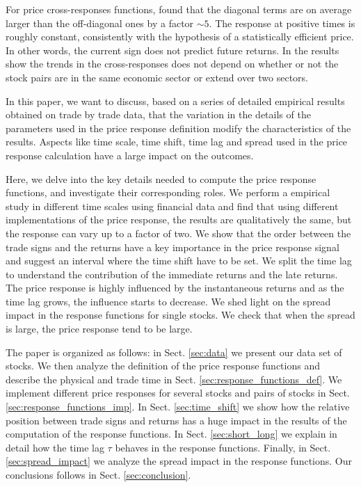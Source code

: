 For price cross-responses functions, \cite{dissecting_cross} found that the
diagonal terms are on average larger than the off-diagonal ones by a factor
$\sim 5$. The response at positive times is roughly constant, consistently with
the hypothesis of a statistically efficient price. In other words, the current
sign does not predict future returns. In \cite{Wang_2016_cross} the results
show the trends in the cross-responses does not depend on whether or not the
stock pairs are in the same economic sector or extend over two sectors.

In this paper, we want to discuss, based on a series of detailed empirical
results obtained on trade by trade data, that the variation in the details of
the parameters used in the price response definition modify the characteristics
of the results. Aspects like time scale, time shift, time lag and spread used
in the price response calculation have a large impact on the outcomes.

Here, we delve into the key details needed to compute the price response
functions, and investigate their corresponding roles. We perform a empirical
study in different time scales using financial data and find that using
different implementations of the price response, the results are qualitatively
the same, but the response can vary up to a factor of two. We show that the
order between the trade signs and the returns have a key importance in the
price response signal and suggest an interval where the time shift have to be
set. We split the time lag to understand the contribution of the immediate
returns and the late returns. The price response is highly influenced by the
instantaneous returns and as the time lag grows, the influence starts to
decrease. We shed light on the spread impact in the response functions for
single stocks. We check that when the spread is large, the price response tend
to be large.

The paper is organized as follows: in Sect. \ref{sec:data} we present our data
set of stocks. We then analyze the definition of the price response functions
and describe the physical and trade time in Sect.
\ref{sec:response_functions_def}. We implement different price responses for
several stocks and pairs of stocks in Sect. \ref{sec:response_functions_imp}.
In Sect. \ref{sec:time_shift} we show how the relative position between trade
signs and returns has a huge impact in the results of the computation of the
response functions. In Sect. \ref{sec:short_long} we explain in detail how the
time lag $\tau$ behaves in the response functions. Finally, in Sect.
\ref{sec:spread_impact} we analyze the spread impact in the response functions.
 Our conclusions follows in Sect. \ref{sec:conclusion}.